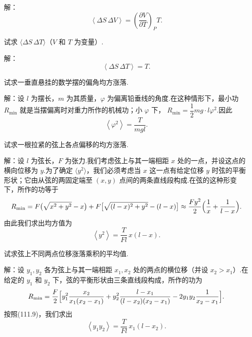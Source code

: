 \begin{xiti}
解：
\begin{equation*}
  \left\langle\Delta S\,\Delta V\right\rangle
  =\left(\frac{\partial V}{\partial T}\right)_{P}T.
\end{equation*}

\quad 试求 $\langle\Delta S\,\Delta T\rangle$（$V$ 和 $T$ 为变量）.

解：
\begin{equation*}
  \left\langle\Delta S\,\Delta T\right\rangle=T.
\end{equation*}

\quad 试求一垂直悬挂的数学摆的偏角均方涨落.

解：设 $l$ 为摆长，$m$ 为其质量，$\varphi$ 为偏离铅垂线的角度.在这种情形下，最小功
$R_{\min}$ 就是当摆偏离时对重力所作的机械功；小 $\varphi$ 下，
$R_{\min}=\dfrac{1}{2}mg\cdot l\varphi^{2}$.因此
\begin{equation*}
  \left\langle\varphi^{2}\right\rangle=\frac{T}{mgl}.
\end{equation*}

\quad 试求一根拉紧的弦上各点偏移的均方涨落.

解：设 $l$ 为弦长，$F$ 为张力.我们考虑弦上与其一端相距 $x$ 处的一点，并设这点的横向位移为
$y$.为了确定 $\langle y^{2}\rangle$，我们必须考虑当 $x$ 这一点有给定位移 $y$ 时弦的平衡形状；它由从弦的两固定端至 $(x,y)$ 点间的两条直线段构成.在弦的这种形变下，所作的功等于
\begin{equation*}
  R_{\min}=F\bigl(\sqrt{x^{2}+y^{2}}-x\bigr)
  +F\bigl[\sqrt{(l-x)^{2}+y^{2}}-(l-x)\bigr]
  \approx\frac{Fy^{2}}{2}\Bigl(\frac{1}{x}+\frac{1}{l-x}\Bigr).
\end{equation*}
由此我们求出均方值为
\begin{equation*}
  \left\langle y^{2}\right\rangle=\frac{T}{Fl}\,x(l-x).
\end{equation*}

\quad 试求弦上不同两点位移涨落乘积的平均值.

解：设 $y_{1},y_{2}$ 各为弦上与其一端相距 $x_{1},x_{2}$ 处的两点的横位移（并设
$x_{2}>x_{1}$）.在给定的 $y_{1}$ 和 $y_{2}$ 下，弦的平衡形状由三条直线段构成，所作的功为
\begin{equation*}
  R_{\min}=\frac{F}{2}\Bigl[y_{1}^{2}\frac{x_{2}}{x_{1}(x_{2}-x_{1})}
  +y_{2}^{2}\frac{l-x_{1}}{(l-x_{2})(x_{2}-x_{1})}
  -2y_{1}y_{2}\frac{1}{x_{2}-x_{1}}\Bigr].
\end{equation*}
按照(111.9)，我们求出
\begin{equation*}
  \left\langle y_{1}y_{2}\right\rangle=\frac{T}{Fl}\,x_{1}(l-x_{2}).
\end{equation*}

\end{xiti}

